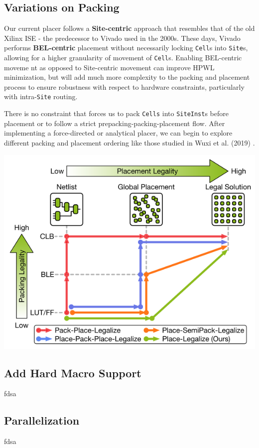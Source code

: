\subsection{Variations on Packing}
Our current placer follows a \textbf{Site-centric} approach that resembles that of the old Xilinx ISE - the predecessor to Vivado used in the 2000s.
These days, Vivado performs \textbf{BEL-centric} placement without necessarily locking \texttt{Cell}s into \texttt{Site}s, allowing for a higher granularity of movement of \texttt{Cell}s. 
Enabling BEL-centric moveme
nt as opposed to Site-centric movement can improve HPWL minimization, but will add much more complexity to the packing and placement process to ensure robustness with respect to hardware constraints, particularly with intra-\texttt{Site} routing.

There is no constraint that forces us to pack \texttt{Cells} into \texttt{SiteInst}s before placement or to follow a strict prepacking-packing-placement flow. 
After implementing a force-directed or analytical placer, we can begin to explore different packing and placement ordering like those studied in Wuxi et al. (2019) \cite{ExplicitPacking}.

{
    \centering
    \includegraphics[width=\columnwidth]{figures/future_work/legalization.png}
}
\vspace{0.25cm}

\subsection{Add Hard Macro Support}
fdsa

\subsection{Parallelization}
fdsa


